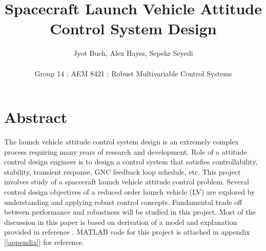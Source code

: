 \documentclass[12pt]{article}
\begin{document}
	\date{} 
	\title{\textbf{Spacecraft Launch Vehicle Attitude Control System Design}}
	\author{Jyot Buch, Alex Hayes, Sepehr Seyedi\\ \\Group 14 : AEM 8421 : Robust Multivariable Control Systems} 
	\maketitle
	
	\section*{Abstract}
	The launch vehicle attitude control system design is an extremely complex process requiring many years of research and development. Role of a attitude control design engineer is to design a control system that satisfies controllability, stability, transient response, GNC feedback loop schedule, etc. This project involves study of a spacecraft launch vehicle attitude control problem. Several control design objectives of a reduced order launch vehicle (LV) are explored by understanding and applying robust control concepts. Fundamental trade off between performance and robustness will be studied in this project. Most of the discussion in this paper is based on derivation of a model and explanation provided in reference \cite{cite1}. MATLAB code for this project is attached in appendix [\ref{appendix}] for reference.
	\clearpage
	\tableofcontents
	\clearpage
	
	\printnomenclature
	
\end{document}
